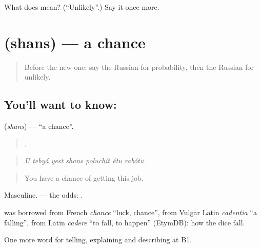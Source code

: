 \begin{tcolorbox}[breakable,colback=teal!4,colframe=teal!35!black,title={Before you move on}]
What does  mean? (\textquotedblleft{}Unlikely\textquotedblright{}.) Say it once more.
\end{tcolorbox}
\section[\texorpdfstring{\ru{шанс} (shans)}{шанс (shans)}]{ (shans) — a chance}

\label{lesson:RU-C372-shans}



\begin{quote}
Before the new one: say the Russian for probability, then the Russian for unlikely.
\end{quote}

\subsection*{You'll want to know: }
\textbf{} (\emph{shans}) — \textquotedblleft{}a chance\textquotedblright{}.

\begin{quote}
      .
\end{quote}

\begin{quote}
\emph{U tebyá yest shans poluchít étu rabótu.}
\end{quote}

\begin{quote}
You have a chance of getting this job.
\end{quote}

Masculine. \emph{} — the odds: \emph{   }.

\begin{cousinweb}
\textbf{} was borrowed from French \emph{chance} \textquotedblleft{}luck, chance\textquotedblright{}, from Vulgar Latin \emph{cadentia} \textquotedblleft{}a falling\textquotedblright{}, from Latin \emph{cadere} \textquotedblleft{}to fall, to happen\textquotedblright{} (EtymDB): how the dice fall.
\end{cousinweb}

\begin{grammarlens}[title={What you've built}]
One more word for telling, explaining and describing at B1.
\end{grammarlens}


